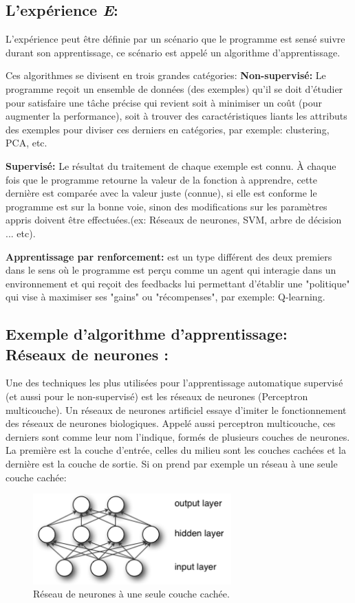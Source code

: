 \subsection{L’expérience \textit{E}:}
L'expérience peut être définie par un scénario que le programme est sensé suivre durant son apprentissage, ce scénario est appelé un algorithme d'apprentissage.

Ces algorithmes se divisent en trois grandes catégories:
\textbf{Non-supervisé:} Le programme reçoit un ensemble de données (des exemples) qu'il se doit d'étudier pour satisfaire une tâche précise qui revient soit à minimiser un coût (pour augmenter la performance), soit à trouver des caractéristiques liants les attributs des exemples pour diviser ces derniers en catégories, par exemple: clustering, PCA, etc.

\textbf{Supervisé:} Le résultat du traitement de chaque exemple est connu. À chaque fois que le programme retourne la valeur de la fonction à apprendre, cette dernière est comparée avec la valeur juste (connue), si elle est conforme le programme est sur la bonne voie, sinon des modifications sur les paramètres appris doivent être effectuées.(ex: Réseaux de neurones, SVM, arbre de décision ... etc).

\textbf{Apprentissage par renforcement:} est un type différent des deux premiers dans le sens où le programme est perçu comme un agent qui interagie dans un environnement et qui reçoit des feedbacks lui permettant d’établir une "politique" qui vise à maximiser ses "gains" ou "récompenses", par exemple: Q-learning.


\subsection{Exemple d'algorithme d'apprentissage: Réseaux de neurones :}
Une des techniques les plus utilisées pour l'apprentissage automatique supervisé (et aussi pour le non-supervisé) est les réseaux de neurones (Perceptron multicouche). 
Un réseaux de neurones artificiel essaye d'imiter le fonctionnement des réseaux de neurones biologiques. Appelé aussi perceptron multicouche, ces derniers sont comme leur nom l'indique, formés de plusieurs couches de neurones. La première est la couche d'entrée, celles du milieu sont les couches cachées et la dernière est la couche de sortie.
Si on prend par exemple un réseau à une seule couche cachée:


\begin{figure}[H]
	\centering
		\includegraphics[width=3in]{Figures/mlp.png}
	\caption[An Electron]{Réseau de neurones à une seule couche cachée.}
	\label{fig:Electron}
\end{figure}

